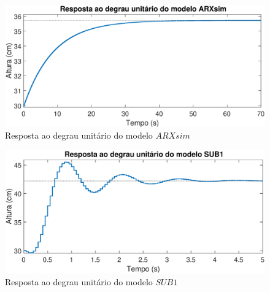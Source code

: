 \begin{figure}[H]
	\centering
	\includegraphics[width=1\linewidth]{respostadegrauarxsim}
	\caption[Resposta ao degrau do modelo $ARXsim$]{Resposta ao degrau unitário do modelo $ARXsim$}
	\label{fig:respostadegrauarxsim}
\end{figure}

\begin{figure}[H]
	\centering
	\includegraphics[width=1\linewidth]{respostadegrausub1}
	\caption[Resposta ao degrau do modelo $SUB1$]{Resposta ao degrau unitário do modelo $SUB1$}
	\label{fig:respostadegrausub}
\end{figure}



